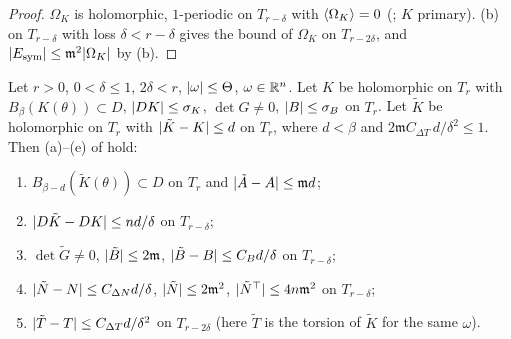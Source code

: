 \begin{proof}
\label{stepI:p1:geo-sym}
$\Omega_K$ is holomorphic, $1$-periodic on $T_{r-\delta}$ with $\langle \Omega_K\rangle=0$ (; $K$ primary). (b) on $T_{r-\delta}$ with loss $\delta<r-\delta$ gives the bound of $\Omega_K$ on $T_{r-2\delta}$, and $\lvert E_{\mathrm{sym}}\rvert\le\mathfrak m^2\lvert \Omega_K\rvert$ by (b).
\end{proof}


\begin{lemma}\label{bpI:p1:perturbation-noA5}
Let $r>0$, $0<\delta\le1$, $2\delta<r$, $\lvert \omega\rvert\le\Theta$, $\omega\in\mathbb{R}^n$. Let $K$ be holomorphic on $T_r$ with $B_\beta(K(\theta))\subset D$, $\lvert DK\rvert\le\sigma_K$, $\det G\ne0$, $\lvert B\rvert\le\sigma_B$ on $T_r$.
Let $\tilde K$ be holomorphic on $T_r$ with $\lvert \tilde K-K\rvert\le d$ on $T_r$, where $d<\beta$ and $2\mathfrak mC_{\Delta T}\,d/\delta^2\le1$. Then (a)--(e) of  hold:
\begin{enumerate}[label=(\alph*)]
\item $B_{\beta-d}(\tilde K(\theta))\subset D$ on $T_r$ and $\lvert \tilde A-A\rvert\le\mathfrak md$;
\item $\lvert D\tilde K-DK\rvert\le nd/\delta$ on $T_{r-\delta}$;
\item $\det\tilde G\ne0$, $\lvert \tilde B\rvert\le2\mathfrak m$, $\lvert \tilde B-B\rvert\le C_Bd/\delta$ on $T_{r-\delta}$;
\item $\lvert \tilde N-N\rvert\le C_{\Delta N}d/\delta$, $\lvert \tilde N\rvert\le2\mathfrak m^2$, $\lvert \tilde N^\top\rvert\le4n\mathfrak m^2$ on $T_{r-\delta}$;
\item $\lvert \tilde T-T\rvert\le C_{\Delta T}d/\delta^2$ on $T_{r-2\delta}$ (here $\tilde T$ is the torsion of $\tilde K$ for the same $\omega$).
\end{enumerate}
\end{lemma}
